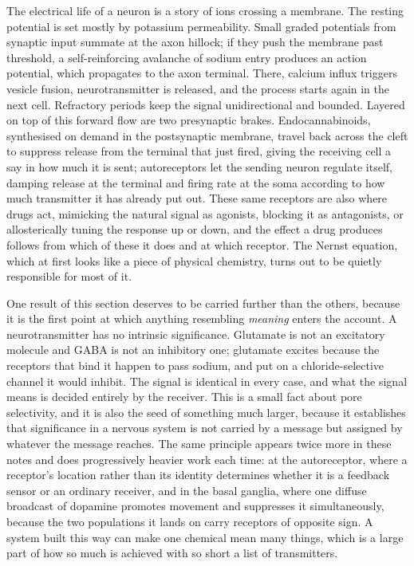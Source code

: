 \documentclass[11pt]{article}
\begin{document}
The electrical life of a neuron is a story of ions crossing a membrane. The resting potential is set mostly by potassium permeability. Small graded potentials from synaptic input summate at the axon hillock; if they push the membrane past threshold, a self-reinforcing avalanche of sodium entry produces an action potential, which propagates to the axon terminal. There, calcium influx triggers vesicle fusion, neurotransmitter is released, and the process starts again in the next cell. Refractory periods keep the signal unidirectional and bounded. Layered on top of this forward flow are two presynaptic brakes. Endocannabinoids, synthesised on demand in the postsynaptic membrane, travel back across the cleft to suppress release from the terminal that just fired, giving the receiving cell a say in how much it is sent; autoreceptors let the sending neuron regulate itself, damping release at the terminal and firing rate at the soma according to how much transmitter it has already put out. These same receptors are also where drugs act, mimicking the natural signal as agonists, blocking it as antagonists, or allosterically tuning the response up or down, and the effect a drug produces follows from which of these it does and at which receptor. The Nernst equation, which at first looks like a piece of physical chemistry, turns out to be quietly responsible for most of it.

One result of this section deserves to be carried further than the others, because it is the first point at which anything resembling \textit{meaning} enters the account. A neurotransmitter has no intrinsic significance. Glutamate is not an excitatory molecule and GABA is not an inhibitory one; glutamate excites because the receptors that bind it happen to pass sodium, and put on a chloride-selective channel it would inhibit. The signal is identical in every case, and what the signal means is decided entirely by the receiver. This is a small fact about pore selectivity, and it is also the seed of something much larger, because it establishes that significance in a nervous system is not carried by a message but assigned by whatever the message reaches. The same principle appears twice more in these notes and does progressively heavier work each time: at the autoreceptor, where a receptor's location rather than its identity determines whether it is a feedback sensor or an ordinary receiver, and in the basal ganglia, where one diffuse broadcast of dopamine promotes movement and suppresses it simultaneously, because the two populations it lands on carry receptors of opposite sign. A system built this way can make one chemical mean many things, which is a large part of how so much is achieved with so short a list of transmitters.
\end{document}
